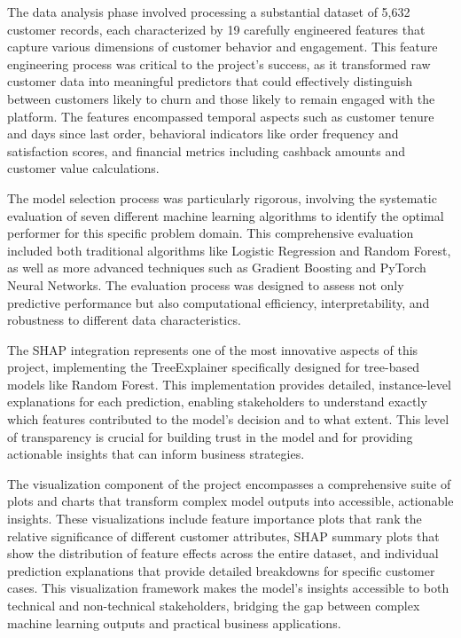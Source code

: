 \documentclass{article}
\begin{document}
The data analysis phase involved processing a substantial dataset of 5,632 customer records, each characterized by 19 carefully engineered features that capture various dimensions of customer behavior and engagement. This feature engineering process was critical to the project's success, as it transformed raw customer data into meaningful predictors that could effectively distinguish between customers likely to churn and those likely to remain engaged with the platform. The features encompassed temporal aspects such as customer tenure and days since last order, behavioral indicators like order frequency and satisfaction scores, and financial metrics including cashback amounts and customer value calculations.

The model selection process was particularly rigorous, involving the systematic evaluation of seven different machine learning algorithms to identify the optimal performer for this specific problem domain. This comprehensive evaluation included both traditional algorithms like Logistic Regression and Random Forest, as well as more advanced techniques such as Gradient Boosting and PyTorch Neural Networks. The evaluation process was designed to assess not only predictive performance but also computational efficiency, interpretability, and robustness to different data characteristics.

The SHAP integration represents one of the most innovative aspects of this project, implementing the TreeExplainer specifically designed for tree-based models like Random Forest. This implementation provides detailed, instance-level explanations for each prediction, enabling stakeholders to understand exactly which features contributed to the model's decision and to what extent. This level of transparency is crucial for building trust in the model and for providing actionable insights that can inform business strategies.

The visualization component of the project encompasses a comprehensive suite of plots and charts that transform complex model outputs into accessible, actionable insights. These visualizations include feature importance plots that rank the relative significance of different customer attributes, SHAP summary plots that show the distribution of feature effects across the entire dataset, and individual prediction explanations that provide detailed breakdowns for specific customer cases. This visualization framework makes the model's insights accessible to both technical and non-technical stakeholders, bridging the gap between complex machine learning outputs and practical business applications.
\end{document}
